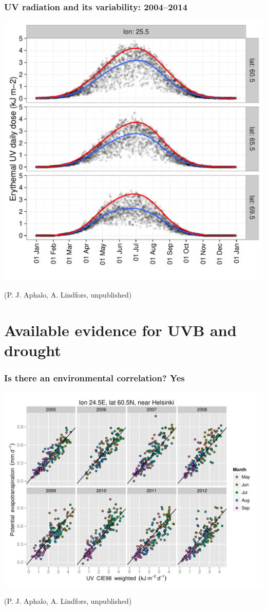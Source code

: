 \documentclass[10pt]{beamer}\usepackage[]{graphicx}\usepackage[]{color}
\begin{document}
\begin{frame}
  \frametitle{UV radiation and its variability: 2004--2014}
  \centering
  \includegraphics[width=0.65\linewidth]{figures/fig-anders1.pdf}
  
  (P. J. Aphalo, A. Lindfors, unpublished)
\end{frame}

\section{Available evidence for UVB and drought}

\begin{frame}
  \frametitle{Is there an environmental correlation? Yes}
  \includegraphics[width=0.8\linewidth]{figures/PET-CIE.pdf}

  (P. J. Aphalo, A. Lindfors, unpublished)
\end{frame}
\end{document}
